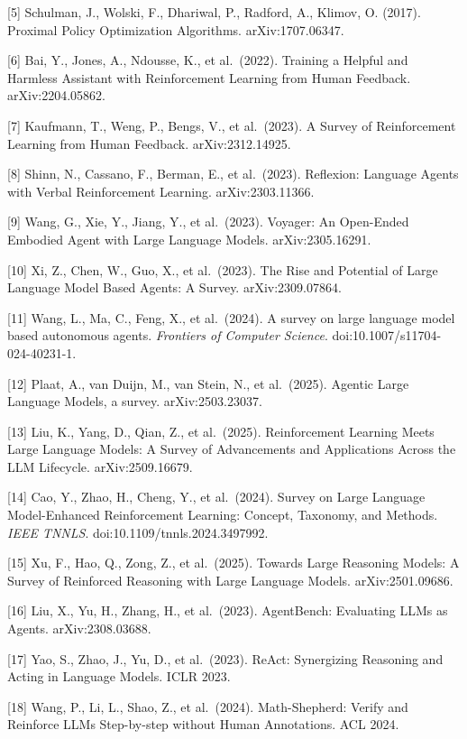 {[}5{]} Schulman, J., Wolski, F., Dhariwal, P., Radford, A., Klimov, O. (2017). Proximal Policy Optimization Algorithms. arXiv:1707.06347.

{[}6{]} Bai, Y., Jones, A., Ndousse, K., et al.~(2022). Training a Helpful and Harmless Assistant with Reinforcement Learning from Human Feedback. arXiv:2204.05862.

{[}7{]} Kaufmann, T., Weng, P., Bengs, V., et al.~(2023). A Survey of Reinforcement Learning from Human Feedback. arXiv:2312.14925.

{[}8{]} Shinn, N., Cassano, F., Berman, E., et al.~(2023). Reflexion: Language Agents with Verbal Reinforcement Learning. arXiv:2303.11366.

{[}9{]} Wang, G., Xie, Y., Jiang, Y., et al.~(2023). Voyager: An Open-Ended Embodied Agent with Large Language Models. arXiv:2305.16291.

{[}10{]} Xi, Z., Chen, W., Guo, X., et al.~(2023). The Rise and Potential of Large Language Model Based Agents: A Survey. arXiv:2309.07864.

{[}11{]} Wang, L., Ma, C., Feng, X., et al.~(2024). A survey on large language model based autonomous agents. \emph{Frontiers of Computer Science}. doi:10.1007/s11704-024-40231-1.

{[}12{]} Plaat, A., van Duijn, M., van Stein, N., et al.~(2025). Agentic Large Language Models, a survey. arXiv:2503.23037.

{[}13{]} Liu, K., Yang, D., Qian, Z., et al.~(2025). Reinforcement Learning Meets Large Language Models: A Survey of Advancements and Applications Across the LLM Lifecycle. arXiv:2509.16679.

{[}14{]} Cao, Y., Zhao, H., Cheng, Y., et al.~(2024). Survey on Large Language Model-Enhanced Reinforcement Learning: Concept, Taxonomy, and Methods. \emph{IEEE TNNLS}. doi:10.1109/tnnls.2024.3497992.

{[}15{]} Xu, F., Hao, Q., Zong, Z., et al.~(2025). Towards Large Reasoning Models: A Survey of Reinforced Reasoning with Large Language Models. arXiv:2501.09686.

{[}16{]} Liu, X., Yu, H., Zhang, H., et al.~(2023). AgentBench: Evaluating LLMs as Agents. arXiv:2308.03688.

{[}17{]} Yao, S., Zhao, J., Yu, D., et al.~(2023). ReAct: Synergizing Reasoning and Acting in Language Models. ICLR 2023.

{[}18{]} Wang, P., Li, L., Shao, Z., et al.~(2024). Math-Shepherd: Verify and Reinforce LLMs Step-by-step without Human Annotations. ACL 2024.


